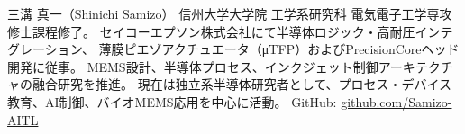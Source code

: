 \documentclass[conference]{IEEEtran}
\begin{document}
\begin{IEEEbiographynophoto}{三溝 真一（Shinichi Samizo）}
信州大学大学院 工学系研究科 電気電子工学専攻 修士課程修了。%
セイコーエプソン株式会社にて半導体ロジック・高耐圧インテグレーション、%
薄膜ピエゾアクチュエータ（μTFP）およびPrecisionCoreヘッド開発に従事。%
MEMS設計、半導体プロセス、インクジェット制御アーキテクチャの融合研究を推進。%
現在は独立系半導体研究者として、プロセス・デバイス教育、AI制御、バイオMEMS応用を中心に活動。%
GitHub: \href{https://github.com/Samizo-AITL}{github.com/Samizo-AITL}
\end{IEEEbiographynophoto}

\balance
\end{document}
